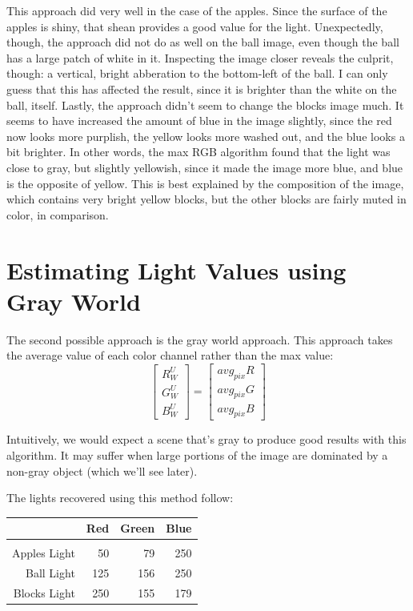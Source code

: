 \documentclass{article}
\begin{document}
This approach did very well in the case of the apples. Since the surface of the 
apples is shiny, that shean provides a good value for the light. Unexpectedly, 
though, the approach did not do as well on the ball image, even though the ball 
has a large patch of white in it. Inspecting the image closer reveals the 
culprit, though: a vertical, bright abberation to the bottom-left of the ball. I 
can only guess that this has affected the result, since it is brighter than the 
white on the ball, itself. Lastly, the approach didn't seem to change the blocks 
image much. It seems to have increased the amount of blue in the image slightly, 
since the red now looks more purplish, the yellow looks more washed out, and the 
blue looks a bit brighter. In other words, the max RGB algorithm found that the 
light was close to gray, but slightly yellowish, since it made the image more 
blue, and blue is the opposite of yellow. This is best explained by the 
composition of the image, which contains very bright yellow blocks, but the 
other blocks are fairly muted in color, in comparison.

\section{Estimating Light Values using Gray World}

The second possible approach is the gray world approach. This approach takes the 
average value of each color channel rather than the max value:
$$
\begin{bmatrix}
    R^U_W \\
    G^U_W \\
    B^U_W
\end{bmatrix} = \begin{bmatrix}
    avg_{pix} R \\
    avg_{pix} G \\
    avg_{pix} B
\end{bmatrix}
$$

Intuitively, we would expect a scene that's gray to produce good results with 
this algorithm. It may suffer when large portions of the image are dominated by 
a non-gray object (which we'll see later).

The lights recovered using this method follow:

\begin{tabular}{r | r r r}
                 & Red & Green & Blue \\
    \hline                            \\
    Apples Light &  50 &    79 &  250 \\
      Ball Light & 125 &   156 &  250 \\
    Blocks Light & 250 &   155 &  179
\end{tabular}
\end{document}
